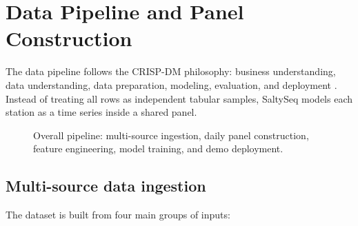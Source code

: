 \documentclass[a4paper, 11pt]{article}
\begin{document}
\section{Data Pipeline and Panel Construction}

The data pipeline follows the CRISP-DM philosophy: business understanding, data understanding, data preparation, modeling, evaluation, and deployment \cite{crispdm}. Instead of treating all rows as independent tabular samples, SaltySeq models each station as a time series inside a shared panel.

\begin{figure}[!htbp]
    \centering
    \caption{Overall pipeline: multi-source ingestion, daily panel construction, feature engineering, model training, and demo deployment.}
    \label{fig:pipeline}
\end{figure}

\subsection{Multi-source data ingestion}

The dataset is built from four main groups of inputs:
\end{document}
